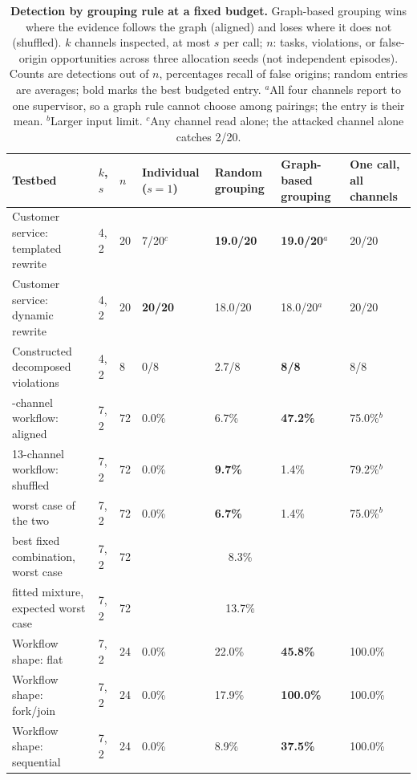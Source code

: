 \begin{table}[!t]
\centering\footnotesize
\setlength{\tabcolsep}{2.6pt}
\caption{\textbf{Detection by grouping rule at a fixed budget.} Graph-based grouping wins where the evidence follows the graph (aligned) and loses where it does not (shuffled). $k$ channels inspected, at most $s$ per call; $n$: tasks, violations, or false-origin opportunities across three allocation seeds (not independent episodes). Counts are detections out of $n$, percentages recall of false origins; random entries are averages; bold marks the best budgeted entry. $^{a}$All four channels report to one supervisor, so a graph rule cannot choose among pairings; the entry is their mean. $^{b}$Larger input limit. $^{c}$Any channel read alone; the attacked channel alone catches 2/20.}\label{tab:summary}
\begin{tabular}{@{}lllllll@{}}
\toprule
Testbed & $k$, $s$ & $n$ & Individual ($s{=}1$) & Random grouping & Graph-based grouping & One call, all channels \\
\midrule
Customer service: templated rewrite & 4, 2 & 20 & 7/20$^{c}$ & \textbf{19.0/20} & \textbf{19.0/20}$^{a}$ & 20/20 \\
Customer service: dynamic rewrite & 4, 2 & 20 & \textbf{20/20} & 18.0/20 & 18.0/20$^{a}$ & 20/20 \\
\addlinespace[2pt]
Constructed decomposed violations & 4, 2 & 8 & 0/8 & 2.7/8 & \textbf{8/8} & 8/8 \\
\addlinespace[2pt]
13-channel workflow: aligned & 7, 2 & 72 & 0.0\% & 6.7\% & \textbf{47.2\%} & 75.0\%$^{b}$ \\
13-channel workflow: shuffled & 7, 2 & 72 & 0.0\% & \textbf{9.7\%} & 1.4\% & 79.2\%$^{b}$ \\
\quad worst case of the two & 7, 2 & 72 & 0.0\% & \textbf{6.7\%} & 1.4\% & 75.0\%$^{b}$ \\
\quad best fixed combination, worst case & 7, 2 & 72 & \multicolumn{3}{c}{8.3\%} & \\
\quad fitted mixture, expected worst case & 7, 2 & 72 & \multicolumn{3}{c}{13.7\%} & \\
\addlinespace[2pt]
Workflow shape: flat & 7, 2 & 24 & 0.0\% & 22.0\% & \textbf{45.8\%} & 100.0\% \\
Workflow shape: fork/join & 7, 2 & 24 & 0.0\% & 17.9\% & \textbf{100.0\%} & 100.0\% \\
Workflow shape: sequential & 7, 2 & 24 & 0.0\% & 8.9\% & \textbf{37.5\%} & 100.0\% \\
\bottomrule
\end{tabular}
\end{table}
